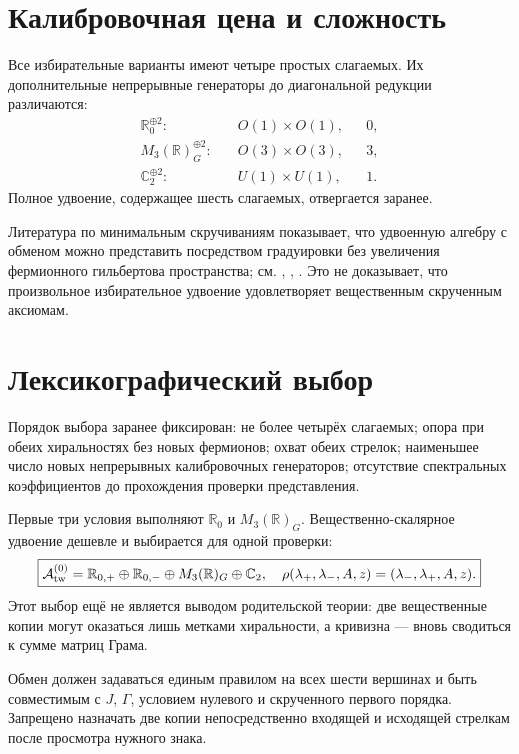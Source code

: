 \section{Калибровочная цена и сложность}

Все избирательные варианты имеют четыре простых слагаемых. Их дополнительные
непрерывные генераторы до диагональной редукции различаются:
\begin{align}
 \mathbb R_0^{\oplus2}:&\quad O(1)\times O(1), &&0,\\
 M_3(\mathbb R)_G^{\oplus2}:&\quad O(3)\times O(3), &&3,\\
 \mathbb C_2^{\oplus2}:&\quad U(1)\times U(1), &&1.
\end{align}
Полное удвоение, содержащее шесть слагаемых, отвергается заранее.

Литература по минимальным скручиваниям показывает, что удвоенную алгебру с
обменом можно представить посредством градуировки без увеличения
фермионного гильбертова пространства; см. ,
, . Это не доказывает, что
произвольное избирательное удвоение удовлетворяет вещественным скрученным
аксиомам.

\section{Лексикографический выбор}

Порядок выбора заранее фиксирован: не более четырёх слагаемых; опора при
обеих хиральностях без новых фермионов; охват обеих стрелок; наименьшее число
новых непрерывных калибровочных генераторов; отсутствие спектральных
коэффициентов до прохождения проверки представления.

Первые три условия выполняют \(\mathbb R_0\) и \(M_3(\mathbb R)_G\).
Вещественно-скалярное удвоение дешевле и выбирается для одной проверки:
\begin{equation}
 \boxed{
 \mathcal A_{\rm tw}^{(0)}
 =\mathbb R_{0,+}\oplus\mathbb R_{0,-}
 \oplus M_3(\mathbb R)_G\oplus\mathbb C_2,
 \quad
 \rho(\lambda_+,\lambda_-,A,z)=(\lambda_-,\lambda_+,A,z).}
 \label{eq:v5-real-scalar-flip-algebra}
\end{equation}
Этот выбор ещё не является выводом родительской теории: две вещественные
копии могут оказаться лишь метками хиральности, а кривизна --- вновь
сводиться к сумме матриц Грама.

\begin{nogocriterion}
Обмен должен задаваться единым правилом на всех шести вершинах и быть
совместимым с \(J\), \(\Gamma\), условием нулевого и скрученного первого
порядка. Запрещено назначать две копии непосредственно входящей и исходящей
стрелкам после просмотра нужного знака.
\end{nogocriterion}

